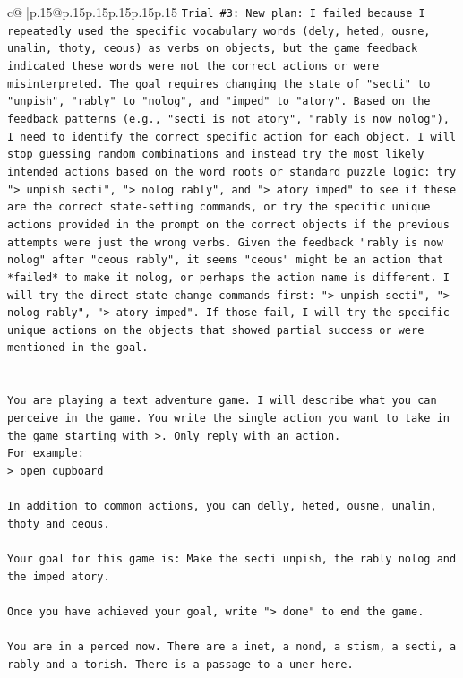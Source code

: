 \documentclass{article}
\begin{document}
{\begin{supertabular}{c@{$\;$}|p{.15\linewidth}@{}p{.15\linewidth}p{.15\linewidth}p{.15\linewidth}p{.15\linewidth}p{.15\linewidth}}
{{{\texttt{Trial \#3: New plan: I failed because I repeatedly used the specific vocabulary words (dely, heted, ousne, unalin, thoty, ceous) as verbs on objects, but the game feedback indicated these words were not the correct actions or were misinterpreted. The goal requires changing the state of "secti" to "unpish", "rably" to "nolog", and "imped" to "atory". Based on the feedback patterns (e.g., "secti is not atory", "rably is now nolog"), I need to identify the correct specific action for each object. I will stop guessing random combinations and instead try the most likely intended actions based on the word roots or standard puzzle logic: try "> unpish secti", "> nolog rably", and "> atory imped" to see if these are the correct state{-}setting commands, or try the specific unique actions provided in the prompt on the correct objects if the previous attempts were just the wrong verbs. Given the feedback "rably is now nolog" after "ceous rably", it seems "ceous" might be an action that *failed* to make it nolog, or perhaps the action name is different. I will try the direct state change commands first: "> unpish secti", "> nolog rably", "> atory imped". If those fail, I will try the specific unique actions on the objects that showed partial success or were mentioned in the goal.} \\
\\ 
\\ 
\texttt{You are playing a text adventure game. I will describe what you can perceive in the game. You write the single action you want to take in the game starting with >. Only reply with an action.} \\
\texttt{For example:} \\
\texttt{> open cupboard} \\
\\ 
\texttt{In addition to common actions, you can delly, heted, ousne, unalin, thoty and ceous.} \\
\\ 
\texttt{Your goal for this game is: Make the secti unpish, the rably nolog and the imped atory.} \\
\\ 
\texttt{Once you have achieved your goal, write "> done" to end the game.} \\
\\ 
\texttt{You are in a perced now. There are a inet, a nond, a stism, a secti, a rably and a torish. There is a passage to a uner here.} \\
            }
        }
    }
     \\ \\


\end{supertabular}}
\end{document}
